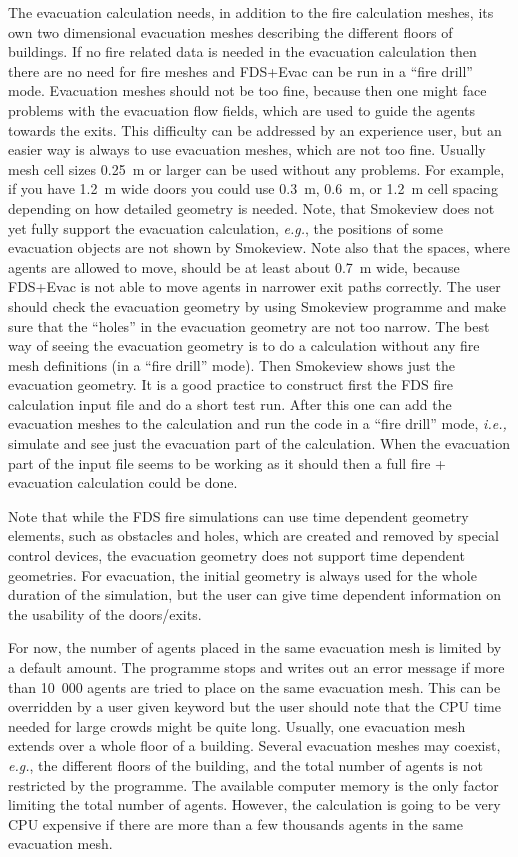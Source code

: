 \documentclass[12pt,a4paper,final,twoside]{stylevk}
\begin{document}
The evacuation calculation needs, in addition to the fire calculation
meshes, its own two dimensional evacuation meshes describing the
different floors of buildings.  If no fire related data is needed in
the evacuation calculation then there are no need for fire meshes and
FDS+Evac can be run in a ``fire drill'' mode.  Evacuation meshes
should not be too fine, because then one might face problems with the
evacuation flow fields, which are used to guide the agents towards the
exits.  This difficulty can be addressed by an experience user, but an
easier way is always to use evacuation meshes, which are not too fine.
Usually mesh cell sizes 0.25~m or larger can be used without any
problems.  For example, if you have 1.2~m wide doors you could use
0.3~m, 0.6~m, or 1.2~m cell spacing depending on how detailed geometry
is needed.  Note, that Smokeview does not yet fully support the
evacuation calculation, \emph{e.g.}, the positions of some evacuation
objects are not shown by Smokeview.  Note also that the spaces, where
agents are allowed to move, should be at least about 0.7~m wide,
because FDS+Evac is not able to move agents in narrower exit paths
correctly.  The user should check the evacuation geometry by using
Smokeview programme and make sure that the ``holes'' in the evacuation
geometry are not too narrow.  The best way of seeing the evacuation
geometry is to do a calculation without any fire mesh definitions (in
a ``fire drill'' mode).  Then Smokeview shows just the evacuation
geometry.  It is a good practice to construct first the FDS fire
calculation input file and do a short test run.  After this one can
add the evacuation meshes to the calculation and run the code in a
``fire drill'' mode, \emph{i.e.,} simulate and see just the evacuation
part of the calculation.  When the evacuation part of the input file
seems to be working as it should then a full fire + evacuation
calculation could be done.


Note that while the FDS fire simulations can use time dependent
geometry elements, such as obstacles and holes, which are created and
removed by special control devices, the evacuation geometry does not
support time dependent geometries.  For evacuation, the initial
geometry is always used for the whole duration of the simulation, but
the user can give time dependent information on the usability of the
doors/exits.


For now, the number of agents placed in the same evacuation mesh is
limited by a default amount.  The programme stops and writes out an
error message if more than 10~000 agents are tried to place on the
same evacuation mesh.  This can be overridden by a user given keyword
but the user should note that the CPU time needed for large crowds
might be quite long.  Usually, one evacuation mesh extends over a
whole floor of a building.  Several evacuation meshes may coexist,
\emph{e.g.}, the different floors of the building, and the total
number of agents is not restricted by the programme.  The available
computer memory is the only factor limiting the total number of
agents.  However, the calculation is going to be very CPU expensive if
there are more than a few thousands agents in the same evacuation
mesh.
\end{document}
